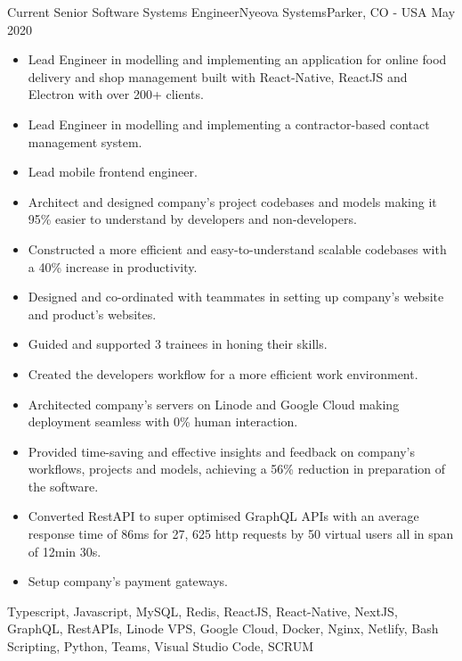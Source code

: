%
%
%

\begin{experiences}
  
      \experience
    {Current}   {Senior Software Systems Engineer}{Nyeova Systems}{Parker, CO - USA}
    {May 2020} {
                      \begin{itemize}
                         \item	Lead Engineer in modelling and implementing an application for online food delivery and shop management built with React-Native, ReactJS and Electron with over 200+ clients.
                         \item Lead Engineer in modelling and implementing a contractor-based contact management system.
			\item Lead mobile frontend engineer.
			\item Architect and designed company's project codebases and models making it 95\% easier to understand by developers and non-developers.
			\item Constructed a more efficient and easy-to-understand scalable codebases with a 40\% increase in productivity.
			\item Designed and co-ordinated with teammates in setting up company's website and product's websites.
			\item Guided and supported 3 trainees in honing their skills.
			\item Created the developers workflow for a more efficient work environment.
			\item Architected company’s servers on Linode and Google Cloud making deployment seamless with 0\% human interaction.
			\item Provided time-saving and effective insights and feedback on company's workflows, projects and models, achieving a 56\% reduction in preparation of the software.
			\item Converted RestAPI to super optimised GraphQL APIs with an average response time of 86ms for 27, 625 http requests by 50 virtual users all in span of 12min 30s.
			\item Setup company's payment gateways.
		    \end{itemize}
                    }
                    {Typescript, Javascript, MySQL, Redis, ReactJS, React-Native, NextJS, GraphQL, RestAPIs, Linode VPS, Google Cloud, Docker, Nginx, Netlify, Bash Scripting, Python, Teams, Visual Studio Code, SCRUM}
  \emptySeparator
  

\end{experiences}
